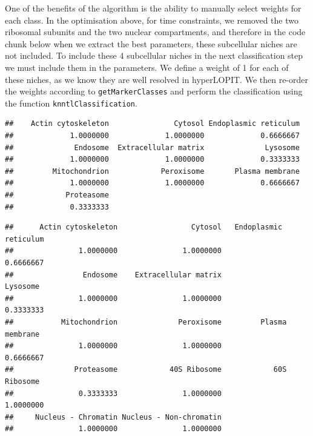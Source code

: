 One of the benefits of the algorithm is the ability to manually select
weights for each class. In the optimisation above, for time
constraints, we removed the two ribosomal subunits and the two nuclear
compartments, and therefore in the code chunk below when we extract
the best parameters, these subcellular niches are not included. To
include these 4 subcellular niches in the next classification step we
must include them in the parameters. We define a weight of 1 for each
of these niches, as we know they are well resolved in hyperLOPIT. We
then re-order the weights according to \texttt{getMarkerClasses} and
perform the classification using the function
\texttt{knntlClassification}.

\begin{knitrout}
\color{fgcolor}\begin{kframe}
\begin{alltt}
 \hlkwb{<-} 
\end{alltt}
\begin{verbatim}
##    Actin cytoskeleton               Cytosol Endoplasmic reticulum 
##             1.0000000             1.0000000             0.6666667 
##              Endosome  Extracellular matrix              Lysosome 
##             1.0000000             1.0000000             0.3333333 
##         Mitochondrion            Peroxisome       Plasma membrane 
##             1.0000000             1.0000000             0.6666667 
##            Proteasome 
##             0.3333333
\end{verbatim}
\begin{alltt}
 \hlkwb{<-} \hlstd{(}\hlstd{,} \hlstd{)}
 \hlkwb{<-} \hlstd{(}\hlstd{,} \hlstd{,}
                         \hlstd{,}
                         \hlstd{)}
 \hlkwb{<-} 
\end{alltt}
\begin{verbatim}
##      Actin cytoskeleton                 Cytosol   Endoplasmic reticulum 
##               1.0000000               1.0000000               0.6666667 
##                Endosome    Extracellular matrix                Lysosome 
##               1.0000000               1.0000000               0.3333333 
##           Mitochondrion              Peroxisome         Plasma membrane 
##               1.0000000               1.0000000               0.6666667 
##              Proteasome            40S Ribosome            60S Ribosome 
##               0.3333333               1.0000000               1.0000000 
##     Nucleus - Chromatin Nucleus - Non-chromatin 
##               1.0000000               1.0000000
\end{verbatim}
\begin{alltt}
 \hlkwb{<-} \hlstd{bestpar[}\hlstd{(hl)]}


\end{alltt}
\end{kframe}
\end{knitrout}
